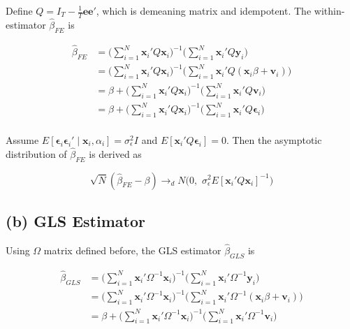 \documentclass[11pt]{article}
\begin{document}
Define $Q=I_T - \frac{1}{T} \mathbf{ee'}$, which is demeaning matrix and idempotent. The within-estimator $\widehat{\beta}_{FE}$ is 

\begin{align*}
\widehat{\beta}_{FE} &= \bigg(\sum_{i=1}^{N} \mathbf{x}_i' Q \mathbf{x}_i\bigg)^{-1}\bigg(\sum_{i=1}^{N} \mathbf{x}_i' Q\mathbf{y}_i   \bigg)\\
&= \bigg(\sum_{i=1}^{N} \mathbf{x}_i' Q \mathbf{x}_i\bigg)^{-1}\bigg(\sum_{i=1}^{N} \mathbf{x}_i' Q( \mathbf{x}_i \beta + \mathbf{v}_i) \bigg)\\
&= \beta + \bigg(\sum_{i=1}^{N} \mathbf{x}_i' Q \mathbf{x}_i\bigg)^{-1}\bigg(\sum_{i=1}^{N} \mathbf{x}_i'Q\mathbf{v}_i   \bigg)\\
&=\beta + \bigg(\sum_{i=1}^{N} \mathbf{x}_i' Q \mathbf{x}_i\bigg)^{-1}\bigg(\sum_{i=1}^{N} \mathbf{x}_i' Q\mathbf{\epsilon}_i   \bigg)\\
\end{align*}

Assume $E[\mathbf{\epsilon}_i \mathbf{\epsilon}_i' \mid \mathbf{x}_i,\alpha_i] = \sigma_\epsilon^2 I$ and $E[\mathbf{x}_i' Q \mathbf{\epsilon}_i]=0$. Then the asymptotic distribution of $\widehat{\beta}_{FE}$ is derived as

\[
\sqrt{N} (\widehat{\beta}_{FE}-\beta) \rightarrow_{d} N\big(0,\,\, \sigma_\epsilon^2 E[\mathbf{x}_i' Q \mathbf{x}_i]^{-1}\big)
\]



\subsection*{(b) GLS Estimator}

Using $\Omega$ matrix defined before, the GLS estimator $\widehat{\beta}_{GLS}$ is

\begin{align*}
\widehat{\beta}_{GLS} &= \bigg(\sum_{i=1}^{N} \mathbf{x}_i' \Omega^{-1} \mathbf{x}_i\bigg)^{-1}\bigg(\sum_{i=1}^{N} \mathbf{x}_i'  \Omega^{-1} \mathbf{y}_i   \bigg)\\
&= \bigg(\sum_{i=1}^{N} \mathbf{x}_i' \Omega^{-1} \mathbf{x}_i\bigg)^{-1}\bigg(\sum_{i=1}^{N} \mathbf{x}_i' \Omega^{-1}( \mathbf{x}_i \beta+ \mathbf{v}_i) \bigg)\\
&=\beta+ \bigg(\sum_{i=1}^{N} \mathbf{x}_i' \Omega^{-1} \mathbf{x}_i\bigg)^{-1}\bigg(\sum_{i=1}^{N} \mathbf{x}_i' \Omega^{-1}\mathbf{v}_i \bigg)\\
\end{align*}
\end{document}
